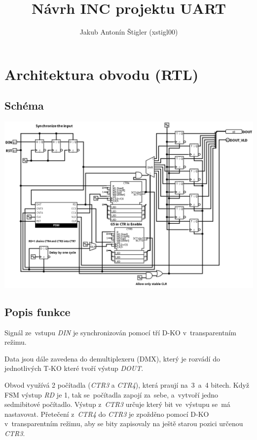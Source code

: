 \documentclass{article}
\title{Návrh INC projektu UART}
\author{Jakub Antonín Štigler (xstigl00)}
\begin{document}
\maketitle


\section{Architektura obvodu (RTL)}

\subsection{Schéma}
\includegraphics*[scale=0.4]{assets/RTL.png}

\subsection{Popis funkce}

Signál ze~vstupu \emph{DIN} je synchronizován pomocí tří D-KO v~transparentním
režimu.

Data jsou dále zavedena do demultiplexeru (DMX), který je rozvádí do
jednotlivých T-KO které tvoří výstup \emph{DOUT}.

Obvod využívá 2 počítadla (\emph{CTR3} a \emph{CTR4}), která praují na~3~a~4
bitech. Když FSM výstup \emph{RD} je 1, tak se~počítadla zapojí za~sebe,
a~vytvoří jedno sedmibitové počítadlo. Výstup z~\emph{CTR3} určuje který bit
ve~výstupu se~má nastavovat. Přetečení z~\emph{CTR4} do \emph{CTR3} je zpožděno
pomocí D-KO v~transparentním režimu, aby se bity zapisovaly na ještě starou
pozici určenou \emph{CTR3}.
\end{document}
